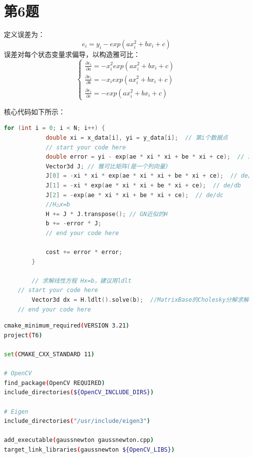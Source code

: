 \documentclass[40pt,a4paper，UTF8]{ctexart}
\numberwithin{equation}{section}
\begin{document}
\section{第6题}
定义误差为：
\begin{equation}
e_i = y_i-exp(ax_i^2+bx_i+c)
\end{equation}
误差对每个状态变量求偏导，以构造雅可比：
\begin{equation}
\left\{
\begin{array}{l}
\frac{\partial{e_i}}{\partial a}=-x_i^2exp(ax_i^2+bx_i+c) \\
\frac{\partial{e_i}}{\partial b}=-x_iexp(ax_i^2+bx_i+c)  \\
\frac{\partial{e_i}}{\partial c}=-exp(ax_i^2+bx_i+c)
\end{array}
\right.
\end{equation}

核心代码如下所示：
\begin{lstlisting}[language=C++, caption=工程/gaussnewon.cpp]
        for (int i = 0; i < N; i++) {
            double xi = x_data[i], yi = y_data[i];  // 第i个数据点
            // start your code here
            double error = yi - exp(ae * xi * xi + be * xi + ce);  // 第i个数据点的计算误差
            Vector3d J; // 雅可比矩阵(是一个列向量)
            J[0] = -xi * xi * exp(ae * xi * xi + be * xi + ce);  // de/da
            J[1] = -xi * exp(ae * xi * xi + be * xi + ce);  // de/db
            J[2] = -exp(ae * xi * xi + be * xi + ce);  // de/dc
            //H△x=b
            H += J * J.transpose(); // GN近似的H
            b += -error * J;
            // end your code here

            cost += error * error;
        }

        // 求解线性方程 Hx=b，建议用ldlt
 	// start your code here
        Vector3d dx = H.ldlt().solve(b);  //MatrixBase的Cholesky分解求解线性方程组
	// end your code here
\end{lstlisting}

\begin{lstlisting}[language=bash, caption=工程/CMakeLists.txt]
cmake_minimum_required(VERSION 3.21)
project(T6)

set(CMAKE_CXX_STANDARD 11)

# OpenCV
find_package(OpenCV REQUIRED)
include_directories(${OpenCV_INCLUDE_DIRS})

# Eigen
include_directories("/usr/include/eigen3")

add_executable(gaussnewton gaussnewton.cpp)
target_link_libraries(gaussnewton ${OpenCV_LIBS})
\end{lstlisting}
\end{document}
